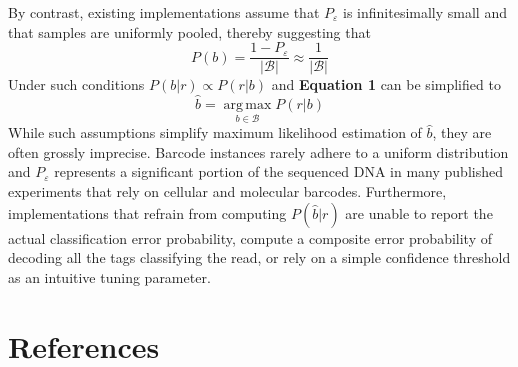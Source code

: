 \documentclass[10pt,twocolumn]{article}
\begin{document}
By contrast, existing implementations \citep{Renaud:2015hma} assume that $P_{\varepsilon}$ is infinitesimally small and that samples are uniformly pooled, thereby suggesting that
%
\begin{equation}
P(b) = \frac{1 - P_{\varepsilon}}{|\mathcal{B}|} %
\approx \frac{1}{|\mathcal{B}|}
\end{equation}
%
Under such conditions $P(b|r) \propto P(r|b)$ and \textbf{Equation 1} can be simplified to
%
\begin{equation}
\hat{b} = \operatorname*{arg\,max}_{b \in \mathcal{B}} P(r|b)
\end{equation}
%
While such assumptions simplify maximum likelihood estimation of $\hat{b}$, they are often grossly imprecise. Barcode instances rarely adhere to a uniform distribution and $P_{\varepsilon}$ represents a significant portion of the sequenced DNA in many published experiments that rely on cellular and molecular barcodes. Furthermore, implementations that refrain from computing $P(\hat{b}|r)$ are unable to report the actual classification error probability, compute a composite error probability of decoding all the tags classifying the read, or rely on a simple confidence threshold as an intuitive tuning parameter.

\section*{References}
\printbibliography[heading=none]
\end{document}
